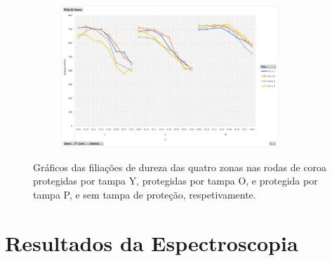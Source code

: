 \begin{figure}[htb]
\begin{subfigure}{.4\textwidth}
        \caption{}
        \label{fig:resultados_Tampa_P_dent}
    \end{subfigure}%
    \begin{subfigure}{.4\textwidth}
        \centering
        \includegraphics[width = 0.9\textwidth]{Figures/Cap4/Grafico_4_Zonas_ST.png}
        \caption{}
        \label{fig:resultados_ST_dent}
    \end{subfigure}
    \caption[Filiações de dureza das quatro zonas na roda de coroa DB45 Nº 1]%
    {Gráficos das filiações de dureza das quatro zonas nas rodas de coroa protegidas por tampa Y, protegidas por tampa O, e protegida por tampa P, e sem tampa de proteção, respetivamente.}
    \label{fig:resultados_4T_dent}
\end{figure}
\section{Resultados da Espectroscopia} \label{sec:resultados_espectroscopia}
